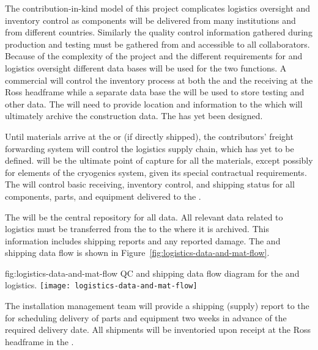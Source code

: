 The contribution-in-kind model of this project complicates logistics oversight and inventory control as components will be delivered from many institutions and from different countries. 
Similarly the quality control information gathered during production and testing must be gathered from and accessible to all collaborators. 
Because of the complexity of the project and the different requirements for  and logistics oversight different data bases will be used for the two functions. A commercial  will control the inventory process at both the  and the  receiving at the Ross headframe while a separate data base the  will be used to store testing and other  data. The  will need to provide location and   information to the  which will ultimately archive the construction data. The  has yet been designed.

Until materials arrive at the  or  (if directly shipped), the contributors' freight forwarding system will control the logistics supply chain, which has yet to be defined.   will be the ultimate point of capture for all the materials, except possibly for elements of the cryogenics system, given its special contractual requirements. The  will control basic receiving, inventory control, and shipping status for all components, parts, and equipment delivered to the .

The  will be the central repository for all  data. All relevant  data related to logistics must be transferred from the  to the  where it is archived. This information includes shipping reports and any reported damage. 
The  and shipping data flow is shown in Figure~\ref{fig:logistics-data-and-mat-flow}.

 

\begin{dunefigure}{fig:logistics-data-and-mat-flow}
  {QC and shipping data flow diagram for the  and  logistics.}
 \texttt{[image: logistics-data-and-mat-flow]}
\end{dunefigure}

 
The  installation management team will provide a shipping (supply) report to the  for scheduling delivery of parts and equipment two weeks in advance of the required delivery date. 
All shipments will be inventoried upon receipt at the Ross headframe in the . 




